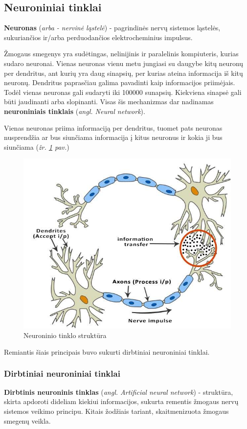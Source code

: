 \documentclass{VUMIFInfKursinis}
\begin{document}
\subsection{Neuroniniai tinklai}
\textbf{Neuronas} (\textit{arba - nervinė ląstelė}) - pagrindinės nervų sistemos ląstelės, sukuriančios ir/arba perduodančios elektrocheminius impulsus.


Žmogaus smegenys yra sudėtingas, nelinijinis ir paralelinis kompiuteris\cite{Hay09}, kurias sudaro neuronai. Vienas neuronas vienu metu jungiasi su daugybe kitų neuronų per dendritus, ant kurių yra daug sinapsių, per kurias ateina informacija iš kitų neuronų. Dendritus paprasčiau galima pavadinti kaip informacijos priimėjais. Todėl vienas neuronas gali sudaryti iki 100000 sunapsių. Kiekviena sinapsė gali būti jaudinanti arba slopinanti. Visas šis mechanizmas dar nadinamas \textbf{neuroniniais tinklais} (\textit{angl. Neural network}).

Vienas neuronas priima informaciją per dendritus, tuomet pats neuronas nusprendžia ar bus siunčiama informacija į kitus neuronus ir kokia ji bus siunčiama (\textit{žr. \ref{img:neuron_structure} pav.})

\begin{figure}[H]
	\centering
	\includegraphics[width=.5\linewidth]{img/neuron-structure}
	\caption{Neuroninio tinklo struktūra \cite{ArtificialNeuralNetwork}}
	\label{img:neuron_structure}
\end{figure}


Remiantis šiais principais buvo sukurti dirbtiniai neuroniniai  tinklai.


\subsubsection{Dirbtiniai neuroniniai tinklai}
\textbf{Dirbtinis neuroninis tinklas} (\textit{angl. Artificial neural network}) - struktūra, skirta apdoroti dideliam kiekiui informacijos, sukurta rementis žmogaus nervų sistemos veikimo principu. Kitais žodžiais tariant, skaitmenizuota žmogaus smegenų veikla.
\end{document}
